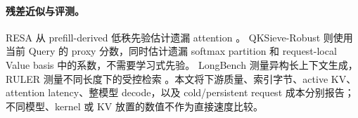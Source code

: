 \paragraph{残差近似与评测。}
RESA 从 prefill-derived 低秩先验估计遗漏 attention \citep{yang2026resa}。
QKSieve-Robust 则使用当前 Query 的 proxy 分数，同时估计遗漏 softmax
partition 和 request-local Value basis 中的系数，不需要学习式先验。
LongBench 测量异构长上下文生成，RULER 测量不同长度下的受控检索
\citep{bai2024longbench,hsieh2024ruler}。本文将下游质量、索引字节、active KV、
attention latency、整模型 decode，以及 cold/persistent request 成本分别报告；
不同模型、kernel 或 KV 放置的数值不作为直接速度比较。
